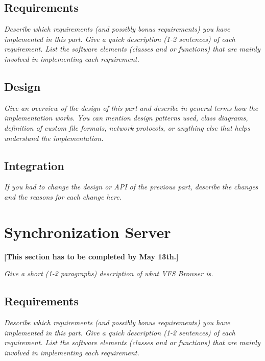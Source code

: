 \documentclass[a4paper,12pt]{article}
\begin{document}
\subsection{Requirements}

\emph{Describe which requirements (and possibly bonus requirements) you have implemented in this part. Give a quick description (1-2 sentences) of each requirement. List the software elements (classes and or functions) that are mainly involved in implementing each requirement.}


\subsection{Design}

\emph{Give an overview of the design of this part and describe in general terms how the implementation works. You can mention design patterns used, class diagrams, definition of custom file formats, network protocols, or anything else that helps understand the implementation.}


\subsection{Integration}

\emph{If you had to change the design or API of the previous part, describe the changes and the reasons for each change here.}




\section{Synchronization Server}

\textbf{[This section has to be completed by May 13th.]}

\emph{Give a short (1-2 paragraphs) description of what VFS Browser is.}


\subsection{Requirements}

\emph{Describe which requirements (and possibly bonus requirements) you have implemented in this part. Give a quick description (1-2 sentences) of each requirement. List the software elements (classes and or functions) that are mainly involved in implementing each requirement.}
\end{document}
